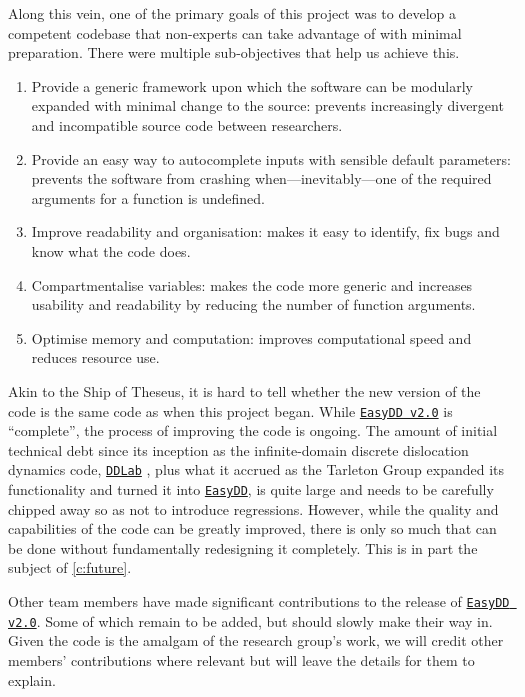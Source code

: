 Along this vein, one of the primary goals of this project was to develop a competent codebase that non-experts can take advantage of with minimal preparation. There were multiple sub-objectives that help us achieve this.
\begin{enumerate}
    \item Provide a generic framework upon which the software can be modularly expanded with minimal change to the source: prevents increasingly divergent and incompatible source code between researchers.
    \item Provide an easy way to autocomplete inputs with sensible default parameters: prevents the software from crashing when---inevitably---one of the required arguments for a function is undefined.
    \item Improve readability and organisation: makes it easy to identify, fix bugs and know what the code does.
    \item Compartmentalise variables: makes the code more generic and increases usability and readability by reducing the number of function arguments.
    \item Optimise memory and computation: improves computational speed and reduces resource use.
\end{enumerate}

Akin to the Ship of Theseus, it is hard to tell whether the new version of the code is the same code as when this project began. While \href{https://github.com/TarletonGroup/EasyDD}{\texttt{EasyDD v2.0}} is ``complete'', the process of improving the code is ongoing. The amount of initial technical debt since its inception as the infinite-domain discrete dislocation dynamics code, \href{http://micro.stanford.edu/wiki/Main_Page}{\texttt{DDLab}} \cite{ddlab}, plus what it accrued as the Tarleton Group expanded its functionality and turned it into \href{https://github.com/TarletonGroup/EasyDD/tree/65907b022d1fe408fc1b2e5c5ca2bd1797ccae04}{\texttt{EasyDD}}, is quite large and needs to be carefully chipped away so as not to introduce regressions. However, while the quality and capabilities of the code can be greatly improved, there is only so much that can be done without fundamentally redesigning it completely. This is in part the subject of \cref{c:future}.

Other team members have made significant contributions to the release of \href{https://github.com/TarletonGroup/EasyDD}{\texttt{EasyDD v2.0}}. Some of which remain to be added, but should slowly make their way in. Given the code is the amalgam of the research group's work, we will credit other members' contributions where relevant but will leave the details for them to explain.

